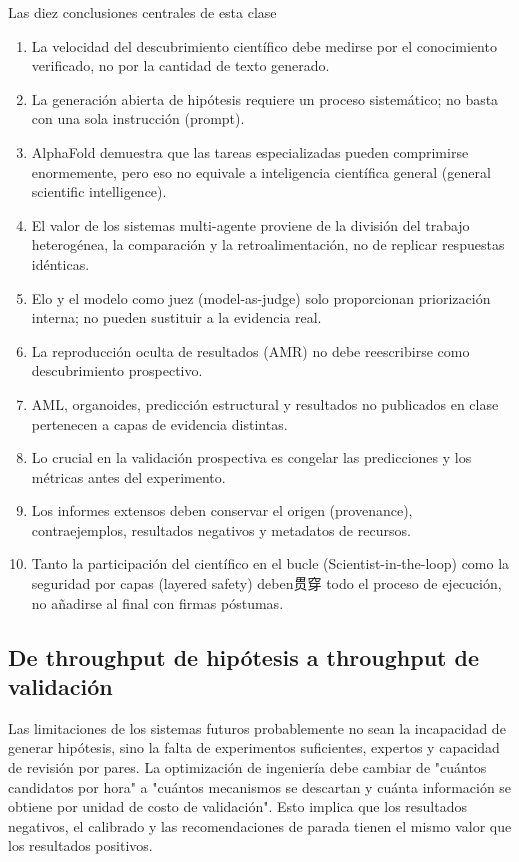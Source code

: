 \begin{importantbox}{Las diez conclusiones centrales de esta clase}
\begin{enumerate}
  \item La velocidad del descubrimiento científico debe medirse por el conocimiento verificado, no por la cantidad de texto generado.
  \item La generación abierta de hipótesis requiere un proceso sistemático; no basta con una sola instrucción (prompt).
  \item AlphaFold demuestra que las tareas especializadas pueden comprimirse enormemente, pero eso no equivale a inteligencia científica general (general scientific intelligence).
  \item El valor de los sistemas multi-agente proviene de la división del trabajo heterogénea, la comparación y la retroalimentación, no de replicar respuestas idénticas.
  \item Elo y el modelo como juez (model-as-judge) solo proporcionan priorización interna; no pueden sustituir a la evidencia real.
  \item La reproducción oculta de resultados (AMR) no debe reescribirse como descubrimiento prospectivo.
  \item AML, organoides, predicción estructural y resultados no publicados en clase pertenecen a capas de evidencia distintas.
  \item Lo crucial en la validación prospectiva es congelar las predicciones y los métricas antes del experimento.
  \item Los informes extensos deben conservar el origen (provenance), contraejemplos, resultados negativos y metadatos de recursos.
  \item Tanto la participación del científico en el bucle (Scientist-in-the-loop) como la seguridad por capas (layered safety) deben贯穿 todo el proceso de ejecución, no añadirse al final con firmas póstumas.
\end{enumerate}
\end{importantbox}

\subsection{De throughput de hipótesis a throughput de validación}

Las limitaciones de los sistemas futuros probablemente no sean la incapacidad de generar hipótesis, sino la falta de experimentos suficientes, expertos y capacidad de revisión por pares. La optimización de ingeniería debe cambiar de "cuántos candidatos por hora" a "cuántos mecanismos se descartan y cuánta información se obtiene por unidad de costo de validación". Esto implica que los resultados negativos, el calibrado y las recomendaciones de parada tienen el mismo valor que los resultados positivos.

